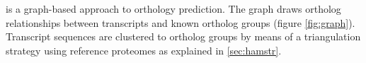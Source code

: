 \label{sec:graph}
\pname is a graph-based approach to orthology prediction. The graph draws
ortholog relationships between transcripts and known ortholog groups (figure
\ref{fig:graph}). Transcript sequences are clustered to ortholog groups by means
of a triangulation strategy using reference proteomes as explained in
\autoref{sec:hamstr}. 



